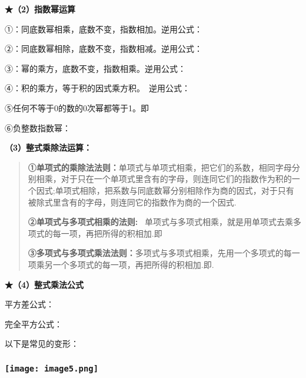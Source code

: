 \textbf{★（2）指数幂运算}

①：同底数幂相乘，底数不变，指数相加。逆用公式：~

②：同底数幂相除，底数不变，指数相减。逆用公式：

③：幂的乘方，底数不变，指数相乘。逆用公式：

④：积的乘方，等于积的因式乘方积。~逆用公式：

⑤任何不等于0的数的0次幂都等于1。即

⑥负整数指数幂：

\textbf{（3）整式乘除法运算：}

\begin{quote}
\textbf{①单项式的乘除法法则：}单项式与单项式相乘，把它们的系数，相同字母分别相乘，对于只在一个单项式里含有的字母，则连同它们的指数作为积的一个因式;单项式相除，把系数与同底数幂分别相除作为商的因式，对于只有被除式里含有的字母，则连同它的指数作为商的一个因式.

\textbf{②单项式与多项式相乘的法则:}
~单项式与多项式相乘，就是用单项式去乘多项式的每一项，再把所得的积相加.即

\textbf{③多项式与多项式乘法法则：}多项式与多项式相乘，先用一个多项式的每一项乘另一个多项式的每一项，再把所得的积相加.即.
\end{quote}

\textbf{★（4）整式乘法公式 ~}

平方差公式： ~

完全平方公式：

以下是常见的变形： ~

\hypertarget{ux5b66ux79d1ux7f51www.zxxk.com--ux6559ux80b2ux8d44ux6e90ux95e8ux6237ux63d0ux4f9bux8bd5ux9898ux8bd5ux5377ux6559ux6848ux8bfeux4ef6ux6559ux5b66ux8bbaux6587ux7d20ux6750ux7b49ux5404ux7c7bux6559ux5b66ux8d44ux6e90ux5e93ux4e0bux8f7dux8fd8ux6709ux5927ux91cfux4e30ux5bccux7684ux6559ux5b66ux8d44ux8baf-3}{%
\subsubsection{\texorpdfstring{\protect\texttt{[image: image5.png]}}{学科网(www.zxxk.com)-\/-教育资源门户，提供试题试卷、教案、课件、教学论文、素材等各类教学资源库下载，还有大量丰富的教学资讯！}}\label{ux5b66ux79d1ux7f51www.zxxk.com--ux6559ux80b2ux8d44ux6e90ux95e8ux6237ux63d0ux4f9bux8bd5ux9898ux8bd5ux5377ux6559ux6848ux8bfeux4ef6ux6559ux5b66ux8bbaux6587ux7d20ux6750ux7b49ux5404ux7c7bux6559ux5b66ux8d44ux6e90ux5e93ux4e0bux8f7dux8fd8ux6709ux5927ux91cfux4e30ux5bccux7684ux6559ux5b66ux8d44ux8baf-3}}


